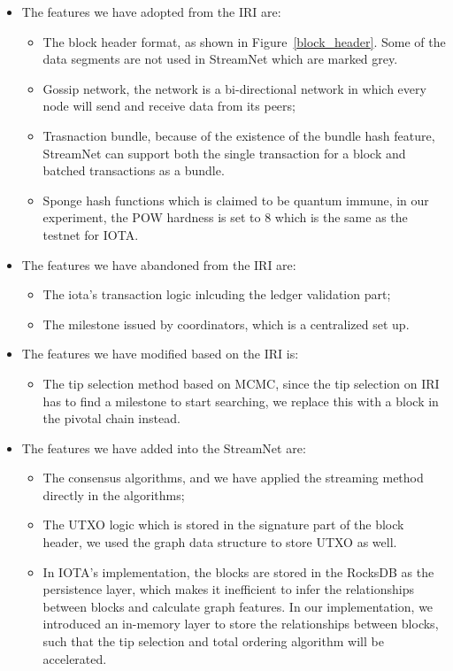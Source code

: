 \begin{itemize}
    \item The features we have adopted from the IRI are: 
    \begin{itemize}
        \item The block header format, as shown in Figure~\ref{block_header}. Some of the data segments are not used in StreamNet which are marked grey.
        \item Gossip network, the network is a bi-directional network in which every node will send and receive data from its peers;
        \item Trasnaction bundle, because of the existence of the bundle hash feature, StreamNet can support both the single transaction for a block and batched transactions as a bundle. 
        \item Sponge hash functions which is claimed to be quantum immune, in our experiment, the POW hardness is set to 8 which is the same as the testnet for IOTA.
    \end{itemize}

    \item The features we have abandoned from the IRI are:
    \begin{itemize}
        \item The iota's transaction logic inlcuding the ledger validation part;
        \item The milestone issued by coordinators, which is a centralized set up. 
    \end{itemize}

    \item The features we have modified based on the IRI is: 
    \begin{itemize}
        \item The tip selection method based on MCMC, since the tip selection on IRI has to find a milestone to start searching, we replace this with a block in the pivotal chain instead.
    \end{itemize}


    \item The features we have added into the StreamNet are: 
    \begin{itemize}
        \item The consensus algorithms, and we have applied the streaming method directly in the algorithms; 
        \item The UTXO logic which is stored in the signature part of the block header, we used the graph data structure to store UTXO as well. 
        \item In IOTA's implementation, the blocks are stored in the RocksDB \cite{RocksDB} as the persistence layer, which makes it inefficient to infer the relationships between blocks and calculate graph features. In our implementation, we introduced an in-memory layer to store the relationships between blocks, such that the tip selection and total ordering algorithm will be accelerated. 
    \end{itemize}
\end{itemize}

